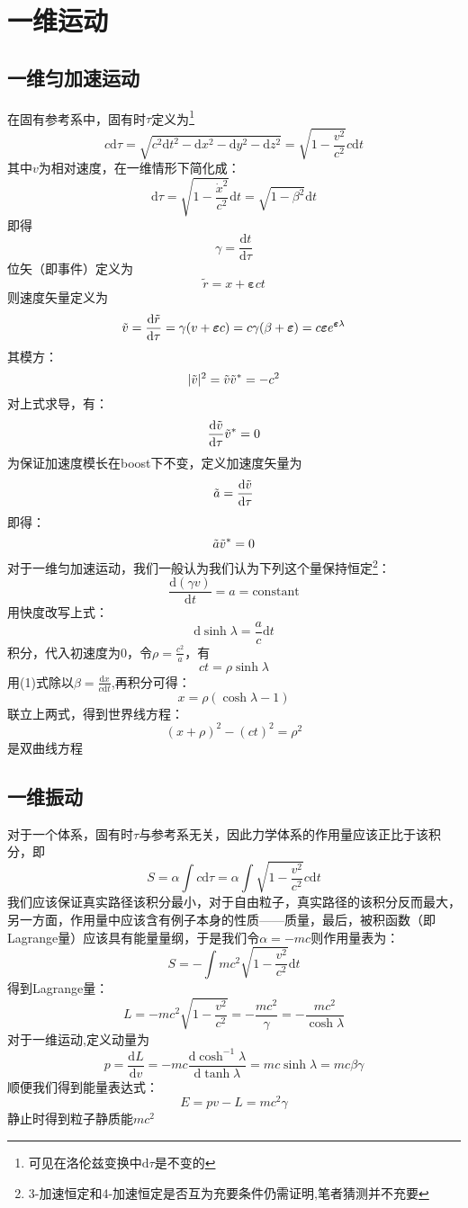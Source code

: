 \documentclass[utf8]{ctexart}
\begin{document}
\section{一维运动}
\subsection{一维匀加速运动}
在固有参考系中，固有时$\tau$定义为\footnote{可见在洛伦兹变换中$\mathrm{d}\tau$是不变的}
\[c\mathrm{d}\tau=\sqrt{c^2\mathrm{d}t^2-\mathrm{d}x^2-\mathrm{d}y^2-\mathrm{d}z^2}=\sqrt{1-\frac{v^2}{c^2}}c\mathrm{d}t\]
其中$v$为相对速度，在一维情形下简化成：\[\mathrm{d}\tau=\sqrt{1-\frac{\dot{x}^2}{c^2}}\mathrm{d}t=\sqrt{1-\beta^2}\mathrm{d}t\]
即得
\[\gamma=\frac{\mathrm{d}t}{\mathrm{d}\tau}\]
位矢（即事件）定义为
\[\tilde{r}=x+{\boldsymbol{\varepsilon}}ct\]
则速度矢量定义为\[\Tilde{v}=\frac{\mathrm{d}\Tilde{r}}{\mathrm{d}\tau}=\gamma(v+{\boldsymbol{\varepsilon}c})=c\gamma(\beta+{\boldsymbol{\varepsilon}})=c{\boldsymbol{\varepsilon}}e^{{\boldsymbol{\varepsilon}}\lambda}\]
其模方：\[|\Tilde{v}|^2=\Tilde{v}\Tilde{v}^*=-c^2\]
对上式求导，有：\[\frac{\mathrm{d}\Tilde{v}}{\mathrm{d}\tau}\Tilde{v}^*=0\]
为保证加速度模长在boost下不变，定义加速度矢量为\[\Tilde{a}=\frac{\mathrm{d}\Tilde{v}}{\mathrm{d}\tau}\]
即得：\[\Tilde{a}\Tilde{v}^*=0\]
对于一维匀加速运动，我们一般认为我们认为下列这个量保持恒定\footnote{3-加速恒定和4-加速恒定是否互为充要条件仍需证明,笔者猜测并不充要}：
\begin{equation}
\frac{\mathrm{d}(\gamma v)}{\mathrm{d}t}=a=\mathrm{constant}
\end{equation}
用快度改写上式：\[\mathrm{d}\sinh{\lambda}=\frac{a}{c}\mathrm{d}t\]
积分，代入初速度为$0$，令$\rho=\frac{c^2}{a}$，有\[ct=\rho \sinh{\lambda}\]
用(1)式除以$\beta=\frac{\mathrm{d}x}{c\mathrm{d}t}$,再积分可得：
\[x=\rho(\cosh{\lambda}-1)\]
联立上两式，得到世界线方程：
\[(x+\rho)^2-(ct)^2=\rho^2\]
是双曲线方程
\subsection{一维振动}
对于一个体系，固有时$\tau$与参考系无关，因此力学体系的作用量应该正比于该积分，即
\[S=\alpha\int c\mathrm{d}\tau=\alpha\int\sqrt{1-\frac{v^2}{c^2}}c\mathrm{d}t\]
我们应该保证真实路径该积分最小，对于自由粒子，真实路径的该积分反而最大，另一方面，作用量中应该含有例子本身的性质——质量，最后，被积函数（即Lagrange量）应该具有能量量纲，于是我们令$\alpha=-mc$则作用量表为：\[S=-\int mc^2\sqrt{1-\frac{v^2}{c^2}}\mathrm{d}t\]
得到Lagrange量：\[L=-mc^2\sqrt{1-\frac{v^2}{c^2}}=-\frac{mc^2}{\gamma}=-\frac{mc^2}{\cosh{\lambda}}\]
对于一维运动,定义动量为\[p=\frac{\mathrm{d}L}{\mathrm{d}v}=-mc\frac{\mathrm{d}\cosh^{-1}{\lambda}}{\mathrm{d}\tanh{\lambda}}=mc\sinh{\lambda}=mc\beta\gamma\]
顺便我们得到能量表达式：\[E=pv-L=mc^2\gamma\]
静止时得到粒子静质能$mc^2$
\end{document}
